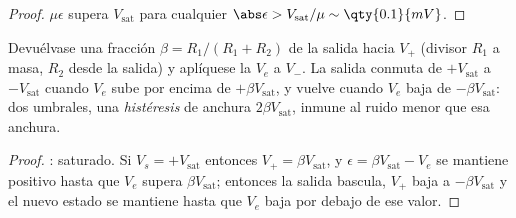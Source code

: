 \begin{proof}
$\mu\epsilon$ supera $V_{\mathrm{sat}}$ para cualquier $\abs\epsilon >
V_{\mathrm{sat}}/\mu \sim \qty{0.1}{mV}$.
\end{proof}

\begin{proposition}\label{prop:b1:operational-amplifier:schmitt}
Devuélvase una fracción $\beta = R_1/(R_1 + R_2)$ de la salida hacia $V_+$
(divisor $R_1$ a masa, $R_2$ desde la salida) y aplíquese la  $V_e$ a
$V_-$. La salida conmuta de $+V_{\mathrm{sat}}$ a $-V_{\mathrm{sat}}$
cuando $V_e$ sube por encima de $+\beta V_{\mathrm{sat}}$, y vuelve cuando
$V_e$ baja de $-\beta V_{\mathrm{sat}}$: dos umbrales, una
\emph{histéresis} de anchura $2\beta V_{\mathrm{sat}}$, inmune al ruido
menor que esa anchura.
\end{proposition}

\begin{proof}
: saturado. Si $V_s = +V_{\mathrm{sat}}$ entonces $V_+ =
\beta V_{\mathrm{sat}}$, y $\epsilon = \beta V_{\mathrm{sat}} - V_e$ se
mantiene positivo hasta que $V_e$ supera $\beta V_{\mathrm{sat}}$;
entonces la salida bascula, $V_+$ baja a $-\beta V_{\mathrm{sat}}$ y el
nuevo estado se mantiene hasta que $V_e$ baja por debajo de ese valor.
\end{proof}

